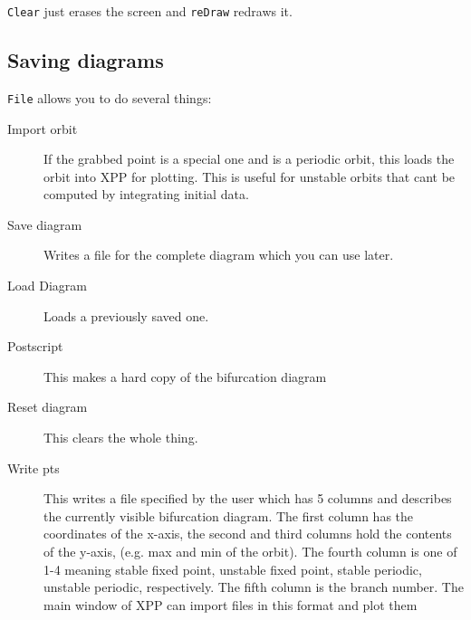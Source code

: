 \documentclass{article}
\begin{document}
{\tt Clear} just erases the screen and {\tt reDraw} redraws it.

\subsection{Saving diagrams}
{\tt File} allows you to do several things:
\begin{description}
\item[Import orbit] If the grabbed point is a special one and is a
periodic orbit, this loads the orbit into XPP for plotting.  This is
useful for unstable orbits that cant be computed by integrating
initial data.
\item[Save diagram] Writes a file for the complete diagram which you
can use later.
\item[Load Diagram] Loads a previously saved one.
\item[Postscript]  This makes a hard copy of the bifurcation diagram
\item[Reset diagram] This clears the whole thing.
\item[Write pts] This writes a file specified by the user which has 5
columns and describes the currently visible bifurcation diagram. The
first column has the coordinates of the x-axis, the second and third
columns hold the contents of the y-axis, (e.g. max and min of the
orbit). The fourth column is one of 1-4 meaning stable fixed point,
unstable fixed point, stable periodic, unstable periodic,
respectively. The fifth column is the branch number.  The main window
of XPP can import files in this format and plot them
\end{description}
\end{document}
